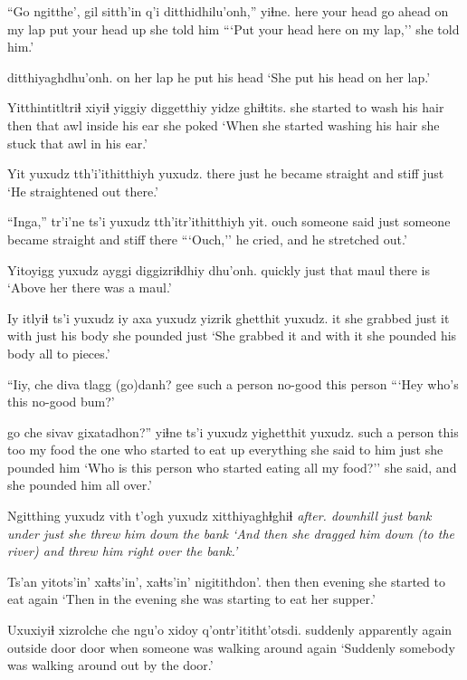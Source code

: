 \documentclass[12pt]{article}
\begin{document}
\gll ``Go ngitthe', gil {sitth'in q'i} ditthidhilu'onh,'' yiɬne.
here {your head} {go ahead} {on my lap} {put your head up} {she told him}
\glt ```Put your head here on my lap,'' she told him.'
\glend

 ditthiyaghdhu'onh.
{on her lap} {he put his head}
\glt `She put his head on her lap.'
\glend

\gll Yitthintitltriɬ xiyiɬ yiggiy diggetthiy yidze ghiɬtits.
{she started to wash his hair} then that awl {inside his ear} {she poked}
\glt `When she started washing his hair she stuck that awl in his ear.'
\glend

\gll Yit yuxudz tth'i'ithitthiyh yuxudz.
there just {he became straight and stiff} just
\glt `He straightened out there.'
\glend

\gll ``Inga,'' tr'i'ne ts'i yuxudz tth'itr'ithitthiyh yit. 
ouch {someone said} {} just {someone became straight and stiff} there
\glt ```Ouch,'' he cried, and he stretched out.' 
\glend

\gll Yitoyigg yuxudz ayggi diggizriɬdhiy dhu'onh.
quickly just that maul {there is}
\glt `Above her there was a maul.'
\glend

\gll Iy itlyiɬ ts'i yuxudz iy axa yuxudz yizrik ghetthit yuxudz.
it {she grabbed} {} just it with just {his body} {she pounded} just
\glt `She grabbed it and with it she pounded his body all to pieces.'
\glend

\gll ``Iiy, {che diva} tlagg (go)danh?
gee {such a person} no-good {this person} 
\glt ```Hey who's this no-good bum?'
\glend

 go che sivav gixatadhon?'' yiɬne ts'i yuxudz yighetthit yuxudz.
{such a person} this too {my food} {the one who started to eat up everything} {she said to him} {} just {she pounded him}
\glt `Who is this person who started eating all my food?'' she said, and she pounded him all over.'
\glend

\gll Ngitthing yuxudz vith t'ogh yuxudz xitthiyaghɬghiɬ \em{after}.
downhill just bank under just {she threw him down the bank}
\glt `And then she dragged him down (to the river) and threw him right over the bank.'
\glend

\gll Ts'an yitots'in' xaɬts'in', xaɬts'in' nigitithdon'.
then then evening {} {she started to eat again}
\glt `Then in the evening she was starting to eat her supper.'
\glend

\gll Uxuxiyiɬ xizrolche che ngu'o xidoy q'ontr'ititht'otsdi.
suddenly apparently again {outside door} door {when someone was walking around again}
\glt `Suddenly somebody was walking around out by the door.'
\glend
\end{document}
